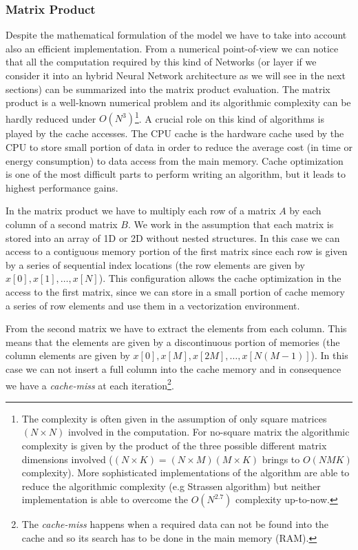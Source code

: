 \documentclass{standalone}
\begin{document}
\subsubsection[Matrix Product]{Matrix Product}\label{NN:gemm}

Despite the mathematical formulation of the model we have to take into account also an efficient implementation.
From a numerical point-of-view we can notice that all the computation required by this kind of Networks (or layer if we consider it into an hybrid Neural Network architecture as we will see in the next sections) can be summarized into the matrix product evaluation.
The matrix product is a well-known numerical problem and its algorithmic complexity can be hardly reduced under $O(N^3)$\footnote{
  The complexity is often given in the assumption of only square matrices $(N\times N)$ involved in the computation.
  For no-square matrix the algorithmic complexity is given by the product of the three possible different matrix dimensions involved ($(N\times K) = (N\times M)(M\times K)$ brings to $O(NMK)$ complexity).
  More sophisticated implementations of the algorithm are able to reduce the algorithmic complexity (e.g Strassen algorithm) but neither implementation is able to overcome the $O(N^{2.7})$ complexity up-to-now.
}.
A crucial role on this kind of algorithms is played by the cache accesses.
The CPU cache is the hardware cache used by the CPU to store small portion of data in order to reduce the average cost (in time or energy consumption) to data access from the main memory.
Cache optimization is one of the most difficult parts to perform writing an algorithm, but it leads to highest performance gains.

In the matrix product we have to multiply each row of a matrix $A$ by each column of a second matrix $B$.
We work in the assumption that each matrix is stored into an array of 1D or 2D without nested structures.
In this case we can access to a contiguous memory portion of the first matrix since each row is given by a series of sequential index locations (the row elements are given by $x[0], x[1], \dots, x[N]$).
This configuration allows the cache optimization in the access to the first matrix, since we can store in a small portion of cache memory a series of row elements and use them in a vectorization environment.

From the second matrix we have to extract the elements from each column.
This means that the elements are given by a discontinuous portion of memories (the column elements are given by $x[0], x[M], x[2M], \dots, x[N(M-1)]$).
In this case we can not insert a full column into the cache memory and in consequence we have a \emph{cache-miss} at each iteration\footnote{
  The \emph{cache-miss} happens when a required data can not be found into the cache and so its search has to be done in the main memory (RAM).
}.
\end{document}
